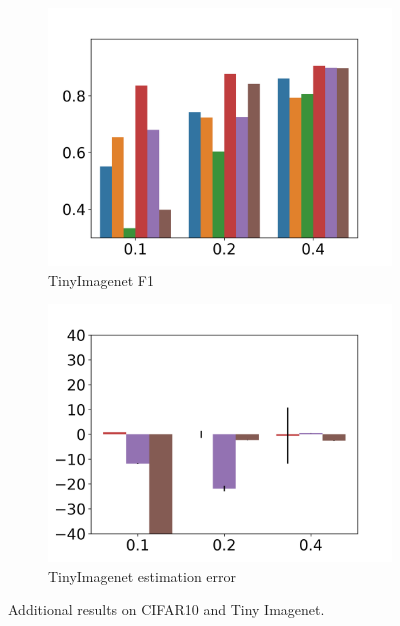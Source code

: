 \documentclass{article}
\begin{document}
\begin{figure}[h]
    \begin{subfigure}[b]{0.22\textwidth}
        \includegraphics[width=\textwidth]{figs/Tinyf1bar.png}
        \vspace{-.5cm}
        \caption{TinyImagenet F1}
    \end{subfigure}
    \begin{subfigure}[b]{0.22\textwidth}
        \includegraphics[width=\textwidth]{figs/TinyNE_bar_mae.png}
        \vspace{-.5cm}
        \caption{TinyImagenet estimation error}
    \end{subfigure}
    \caption[Estimation]{Additional results on CIFAR10 and Tiny Imagenet.}
    \label{fig:NEcifar10}
\end{figure}
\end{document}
